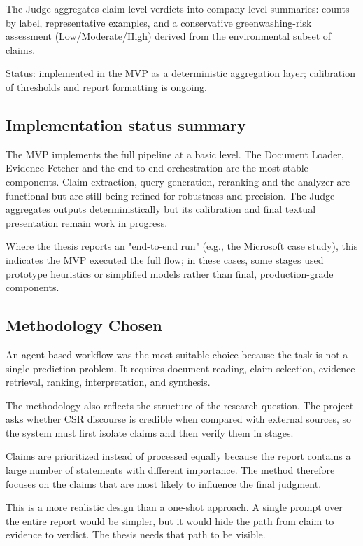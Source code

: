 The Judge aggregates claim-level verdicts into company-level summaries: counts by label, representative examples, and a conservative greenwashing-risk assessment (Low/Moderate/High) derived from the environmental subset of claims.

Status: implemented in the MVP as a deterministic aggregation layer; calibration of thresholds and report formatting is ongoing.

\subsection{Implementation status summary}

The MVP implements the full pipeline at a basic level. The Document Loader, Evidence Fetcher and the end-to-end orchestration are the most stable components. Claim extraction, query generation, reranking and the analyzer are functional but are still being refined for robustness and precision. The Judge aggregates outputs deterministically but its calibration and final textual presentation remain work in progress.

Where the thesis reports an "end-to-end run" (e.g., the Microsoft case study), this indicates the MVP executed the full flow; in these cases, some stages used prototype heuristics or simplified models rather than final, production-grade components.


\subsection{Methodology Chosen}

An agent-based workflow was the most suitable choice because the task is not a single prediction problem. It requires document reading, claim selection, evidence retrieval, ranking, interpretation, and synthesis.

The methodology also reflects the structure of the research question. The project asks whether CSR discourse is credible when compared with external sources, so the system must first isolate claims and then verify them in stages.

Claims are prioritized instead of processed equally because the report contains a large number of statements with different importance. The method therefore focuses on the claims that are most likely to influence the final judgment.

This is a more realistic design than a one-shot approach. A single prompt over the entire report would be simpler, but it would hide the path from claim to evidence to verdict. The thesis needs that path to be visible.

